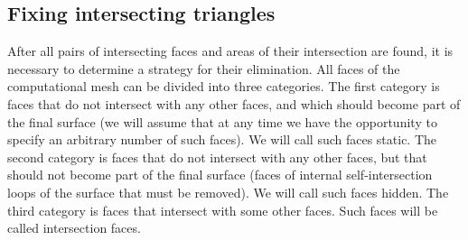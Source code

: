 \documentclass[
11pt,%
tightenlines,%
twoside,%
onecolumn,%
nofloats,%
nobibnotes,%
nofootinbib,%
superscriptaddress,%
noshowpacs,%
centertags]%
{revtex4-2}
\begin{document}
\subsection{Fixing intersecting triangles}

After all pairs of intersecting faces and areas of their intersection are found, it is necessary to determine a strategy for their elimination.
All faces of the computational mesh can be divided into three categories.
The first category is faces that do not intersect with any other faces, and which should become part of the final surface (we will assume that at any time we have the opportunity to specify an arbitrary number of such faces).
We will call such faces static.
The second category is faces that do not intersect with any other faces, but that should not become part of the final surface (faces of internal self-intersection loops of the surface that must be removed).
We will call such faces hidden.
The third category is faces that intersect with some other faces.
Such faces will be called intersection faces.
\end{document}

